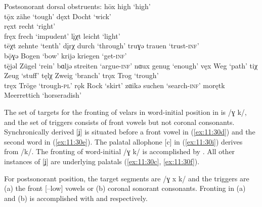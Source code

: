 \ea%
\label{ex:11:31}Postsonorant dorsal obstruents:
\ea\label{ex:11:31a} hōx \tab  [hoːx] \tab high \tab ‘high’ \\
    tǭx \tab [tɔːx] \tab zähe \tab ‘tough’ 
\ex\label{ex:11:31b} dęxt \tab [dɛxt] \tab Docht \tab ‘wick’ \\
    ręxt \tab [rɛxt] \tab recht \tab ‘right’ \\
    fręx \tab [frɛx] \tab frech \tab ‘impudent’ 
\ex\label{ex:11:31c} l\k{i}χt \tab [lɪçt] \tab leicht \tab ‘light’ \\
    tēχt \tab [teːçt] \tab zehnte \tab ‘tenth’ 
\ex\label{ex:11:31d} d\k{i}rχ \tab [dɪrç] \tab durch \tab ‘through’ 
\ex\label{ex:11:31e} truɣə \tab [truɣə] \tab trauen \tab ‘trust-\textsc{inf}’ \\
    bǭɣə \tab [bɔːɣə] \tab Bogen \tab ‘bow’ 
\ex\label{ex:11:31f} krijə \tab [kriʝə] \tab kriegen \tab ‘get-\textsc{inf}’ \\
    t\={ę}jəl \tab [tɛːʝəl] \tab Zügel \tab ‘rein’ 
\ex\label{ex:11:31g} bɑljə \tab [bɑlʝə] \tab streiten \tab ‘argue-\textsc{inf}’ 
\ex\label{ex:11:31h} nɑux \tab [nɑux] \tab genug \tab ‘enough’ 
\ex\label{ex:11:31i} vęx \tab [vɛx] \tab Weg \tab ‘path’ 
\ex\label{ex:11:31j} tiχ \tab [tiç] \tab Zeug \tab ‘stuff’ 
\ex\label{ex:11:31k} tęlχ \tab  [tɛlç] \tab Zweig \tab ‘branch’ 
\ex\label{ex:11:31l} trǫx \tab [trɔx] \tab Trog \tab ‘trough’ \\
    tręx \tab [trɛx] \tab Tröge \tab ‘trough-\textsc{pl}’ 
\ex\label{ex:11:31m} rǫk \tab [rɔk] \tab Rock \tab ‘skirt’ 
\ex\label{ex:11:31n} zɑikə \tab [zɑicə] \tab suchen \tab ‘search-\textsc{inf}’ 
\ex\label{ex:11:31o} morętk \tab [morɛtc] \tab Meerrettich \tab ‘horseradish’ 
\z 
\z 

The set of targets for the fronting of velars in word-initial position in  is /ɣ k/, and the set of triggers consists of front vowels but not coronal consonants. Synchronically derived [ʝ] is situated before a front vowel in (\ref{ex:11:30d}) and the second word in (\ref{ex:11:30e}). The palatal allophone [c] in (\ref{ex:11:30i}) derives from /k/. The fronting of word-initial /ɣ k/ is accomplished by . All other instances of [ʝ] are underlying palatals (\ref{ex:11:30c}, \ref{ex:11:30f}).

For postsonorant position, the target segments are /ɣ x k/ and the triggers are (a) the front [--low] vowels or (b) coronal sonorant consonants. Fronting in (a) and (b) is accomplished with  and  respectively.


